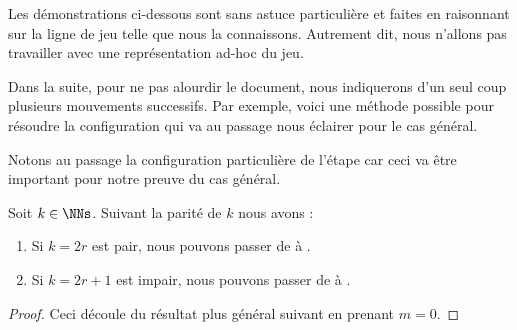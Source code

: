 Les démonstrations ci-dessous sont sans astuce particulière et faites en raisonnant sur la ligne de jeu telle que nous la connaissons. Autrement dit, nous n'allons pas travailler avec une représentation ad-hoc du jeu.


\begin{remark}
	Dans la suite, pour ne pas alourdir le document, nous indiquerons d'un seul coup plusieurs mouvements successifs.
	Par exemple, voici une méthode possible pour résoudre la configuration  qui va au passage nous éclairer pour le cas général.
	\begin{mvts}
		\medskip
		\item  {}

		\medskip
		\item  {}

		\medskip
		\item  {}

		\medskip
		\item  {}

		\medskip
		\item  {}
	\end{mvts}

	Notons au passage la configuration particulière de l'étape  car ceci va être important pour notre preuve du cas général. 
\end{remark}



\begin{fact} \label{kNkB-reduction}
	Soit $k \in \NNs$. Suivant la parité de $k$ nous avons :
	\begin{enumerate}
		\item Si $k = 2r$ est pair, nous pouvons passer de  à  .

		\item Si $k = 2r+1$ est impair, nous pouvons passer de  à  .
	\end{enumerate}
\end{fact}


\begin{proof}
	Ceci découle du résultat plus général suivant en prenant $m = 0$.
\end{proof}



